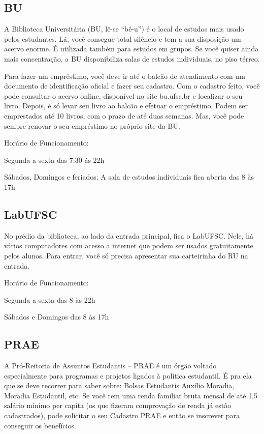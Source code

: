 \documentclass{article}
\begin{document}
\subsection{BU}
A Biblioteca Universitária (BU, lê-se “bê-u”) é o local de estudos mais usado pelos estudantes. Lá, você consegue total silêncio e tem a sua disposição um acervo enorme. É utilizada também para estudos em grupos. Se você quiser ainda mais concentração, a BU disponibiliza salas de estudos individuais, no piso térreo.

Para fazer um empréstimo, você deve ir até o balcão de atendimento com um documento de identificação oficial  e fazer seu cadastro. Com o cadastro feito, você pode consultar o acervo online, disponível no site bu.ufsc.br e localizar o seu livro. Depois, é só levar seu livro ao balcão e efetuar o empréstimo. Podem ser emprestados até 10 livros, com o prazo de até duas semanas. Mas, você pode sempre renovar o seu empréstimo no próprio site da BU.

Horário de Funcionamento:


Segunda a sexta das 7:30 ás 22h

Sábados, Domingos e feriados: A sala de estudos individuais fica aberta das 8 às 17h

\subsection{LabUFSC}
No prédio da biblioteca, ao lado da entrada principal, fica o LabUFSC. Nele, há vários computadores com acesso a internet que podem ser usados gratuitamente pelos alunos. Para entrar, você só precisa apresentar sua carteirinha do RU na entrada.

Horário de Funcionamento:


Segunda a sexta das 8 às 22h

Sábados e Domingos das 8 às 17h

\subsection{PRAE} A Pró-Reitoria de Assuntos Estudantis – PRAE é um órgão voltado especialmente para programas e projetos ligados à política estudantil. É pra ela que se deve recorrer para saber sobre: Bolsas Estudantis  Auxílio Moradia, Moradia Estudantil, etc. Se você tem uma renda familiar bruta mensal de até 1,5 salário mínimo per capita (os que fizeram comprovação de renda já estão cadastrados), pode solicitar o seu Cadastro PRAE e então se inscrever para conseguir os benefícios. 
\end{document}
